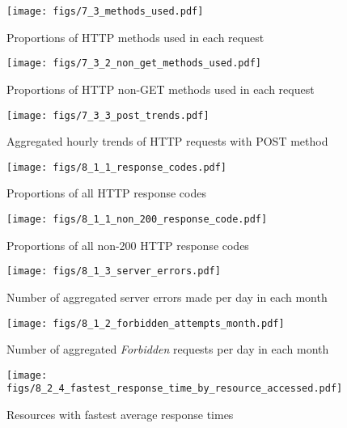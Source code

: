\documentclass[12pt,titlepage]{article}
\begin{document}
\begin{figure}[thbp]
  \centering
  \texttt{[image: figs/7\_3\_methods\_used.pdf]}
  \caption{Proportions of HTTP methods used in each request}
  \label{fig:7_3_methods_used}
\end{figure}

\begin{figure}[thbp]
  \centering
  \texttt{[image: figs/7\_3\_2\_non\_get\_methods\_used.pdf]}
  \caption{Proportions of HTTP non-GET methods used in each request}
  \label{fig:7_3_2_non_get_methods_used}
\end{figure}

\begin{figure}[thbp]
  \centering
  \texttt{[image: figs/7\_3\_3\_post\_trends.pdf]}
  \caption{Aggregated hourly trends of HTTP requests with POST method}
  \label{fig:7_3_3_post_trends}
\end{figure}

\begin{figure}[thbp]
  \centering
  \texttt{[image: figs/8\_1\_1\_response\_codes.pdf]}
  \caption{Proportions of all HTTP response codes}
  \label{fig:8_1_1_response_codes}
\end{figure}

\begin{figure}[thbp]
  \centering
  \texttt{[image: figs/8\_1\_1\_non\_200\_response\_code.pdf]}
  \caption{Proportions of all non-200 HTTP response codes}
  \label{fig:8_1_1_non_200_response_code}
\end{figure}


\begin{figure}[thbp]
  \centering
  \texttt{[image: figs/8\_1\_3\_server\_errors.pdf]}
  \caption{Number of aggregated server errors made per day in each month}
  \label{fig:8_1_3_server_errors}
\end{figure}

\begin{figure}[thbp]
  \centering
  \texttt{[image: figs/8\_1\_2\_forbidden\_attempts\_month.pdf]}
  \caption{Number of aggregated \textit{Forbidden} requests per day in each month}
  \label{fig:8_1_2_forbidden_attempts_month}
\end{figure}


\begin{figure}[thbp]
  \centering
  \texttt{[image: figs/8\_2\_4\_fastest\_response\_time\_by\_resource\_accessed.pdf]}
  \caption{Resources with fastest average response times}
  \label{fig:8_2_4_fastest_response_time_by_resource_accessed}
\end{figure}
\end{document}
